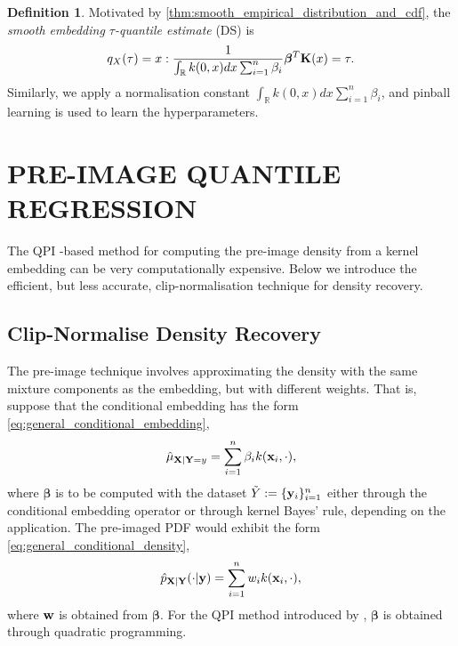 \documentclass[twoside]{article} \usepackage{aistats2017}
\theoremstyle{definition}
\newtheorem{definition}{Definition}[section]
\theoremstyle{theorem}
\newcommand{\rv}[1]{{#1}}
\newcommand{\ds}[1]{\tilde{#1}}
\newcommand{\qpi}{QPI }
\begin{document}
		\theoremstyle{definition}
		\begin{definition}
			Motivated by \cref{thm:smooth_empirical_distribution_and_cdf}, the \textit{smooth embedding $\tau$-quantile estimate} (DS) is
			\begin{equation}
			q_{\rv{X}}(\tau) = x : \frac{1}{\int_{\mathbb{R}} k(0, x) dx \sum_{i = 1}^{n} \beta_{i}} \bm{\beta}^{T} \bvec{K}(x) = \tau.
			\end{equation}	
			Similarly, we apply a normalisation constant $\int_{\mathbb{R}} k(0, x) dx \sum_{i = 1}^{n} \beta_{i}$, and pinball learning is used to learn the hyperparameters.
		\end{definition}
	
\section{PRE-IMAGE QUANTILE REGRESSION}
	\label{sec:pre_image_quantile_regression}

	The \qpi-based method for computing the pre-image density from a kernel embedding can be very computationally expensive.
	Below we introduce the efficient, but less accurate, clip-normalisation technique for density recovery.
	
	\subsection{Clip-Normalise Density Recovery}
	\label{sec:pre_image_quantile_regression:density_recovery}
	
		The pre-image technique involves approximating the density with the same mixture components as the embedding, but with different weights. That is, suppose that the conditional embedding has the form \eqref{eq:general_conditional_embedding},
		\begin{equation}
			\hat{\mu}_{\mathbf{X} | \mathbf{Y} = y}= \sum_{i = 1}^{n} \beta_{i} k(\mathbf{x}_{i}, \cdot),
		\label{eq:general_conditional_embedding}
		\end{equation}		
		where $\bm{\beta}$ is to be computed with the dataset $\ds{Y} := \{\bvec{y}_{i}\}_{i = 1}^{n}$ either through the conditional embedding operator or through kernel Bayes' rule, depending on the application. The pre-imaged PDF would exhibit the form \eqref{eq:general_conditional_density},
		\begin{equation}
		\hat{p}_{\mathbf{X} | \mathbf{Y}}(\cdot | \mathbf{y}) = \sum_{i = 1}^{n} w_{i} k(\mathbf{x}_{i}, \cdot),
		\label{eq:general_conditional_density}
		\end{equation}
		where $\mathbf{w}$ is obtained from $\bm{\beta}$. For the \qpi method introduced by \cite{mccalman2013multi}, $\bm{\beta}$ is obtained through quadratic programming.
		
\end{document}
